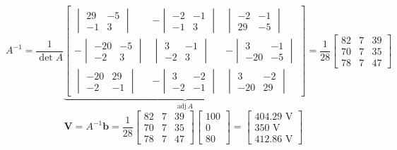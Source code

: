 \documentclass[11pt]{article}
\begin{document}
\begin{enumerate}[leftmargin=*,label=\textbf{\arabic*.}]
\[A^{-1}=\frac1{\det A}\underbrace{\begin{bmatrix}
\begin{vmatrix}29 & -5 \\ -1  & 3\end{vmatrix} & -\begin{vmatrix}-2 & -1 \\ -1  & 3\end{vmatrix} & \begin{vmatrix}-2 & -1 \\ 29  & -5\end{vmatrix} \\[1em]
-\begin{vmatrix}-20 & -5 \\ -2  & 3\end{vmatrix} & \begin{vmatrix}3 & -1 \\ -2  & 3\end{vmatrix} & -\begin{vmatrix}3 & -1 \\ -20  & -5\end{vmatrix} \\[1em]
\begin{vmatrix}-20 & 29 \\ -2  & -1\end{vmatrix} & -\begin{vmatrix}3 & -2 \\ -2  & -1\end{vmatrix} & \begin{vmatrix}3 & -2 \\ -20  & 29\end{vmatrix}
\end{bmatrix}}_{\text{adj}\,A}=\frac{1}{28}
\begin{bmatrix}
82 & 7 & 39 \\
70 & 7 & 35 \\
78 & 7 & 47
\end{bmatrix}
\]
\[\mathbf{V}=A^{-1}\mathbf{b}=\frac{1}{28}
\begin{bmatrix}
82 & 7 & 39 \\
70 & 7 & 35 \\
78 & 7 & 47
\end{bmatrix}\begin{bmatrix}
100 \\
0 \\
80
\end{bmatrix}=\begin{bmatrix}
404.29\text{ V}\\ 350 \text{ V}\\412.86\text{ V}
\end{bmatrix}\]


\end{enumerate}
\end{document}
